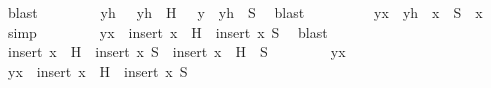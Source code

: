\begin{isabellebody}
\ blast\isanewline
\ \ \ \ \isamarkupfalse%
\ {}\ \isamarkupfalse%
\ yh\ \ {}{\isacharcolon}{\kern0pt}\ {\isachardoublequoteopen}yh\ {\isasymin}\ H{\isachardoublequoteclose}\ \ {}{\isacharcolon}{\kern0pt}\ {\isachardoublequoteopen}y\ {\isacharequal}{\kern0pt}\ yh\ {\isasyminter}\ S{\isachardoublequoteclose}\ \isamarkupfalse%
\ blast\isanewline
\ \ \ \ \isamarkupfalse%
\ {}\ {}\ \isamarkupfalse%
\ {\isachardoublequoteopen}y{\isacharunderscore}{\kern0pt}x\ {\isacharequal}{\kern0pt}\ {\isacharparenleft}{\kern0pt}yh\ {\isasymunion}\ {\isacharbraceleft}{\kern0pt}x{\isacharbraceright}{\kern0pt}{\isacharparenright}{\kern0pt}\ {\isasyminter}\ {\isacharparenleft}{\kern0pt}S\ {\isasymunion}\ {\isacharbraceleft}{\kern0pt}x{\isacharbraceright}{\kern0pt}{\isacharparenright}{\kern0pt}{\isachardoublequoteclose}\ \isamarkupfalse%
\ simp\isanewline
\ \ \ \ \isamarkupfalse%
\ {}\ \isamarkupfalse%
\ {\isachardoublequoteopen}y{\isacharunderscore}{\kern0pt}x\ {\isasymin}\ {\isacharparenleft}{\kern0pt}insert\ x\ {\isacharbackquote}{\kern0pt}\ H{\isacharparenright}{\kern0pt}\ {\isasyminter}{\isacharasterisk}{\kern0pt}\ {\isacharparenleft}{\kern0pt}insert\ x\ S{\isacharparenright}{\kern0pt}{\isachardoublequoteclose}\ \isamarkupfalse%
\ blast\isanewline
\ \ \isamarkupfalse%
\isanewline
{}\isamarkupfalse%
\isanewline
\ \ \isamarkupfalse%
\ {\isachardoublequoteopen}insert\ x\ {\isacharbackquote}{\kern0pt}\ H\ {\isasyminter}{\isacharasterisk}{\kern0pt}\ {\isacharparenleft}{\kern0pt}insert\ x\ S{\isacharparenright}{\kern0pt}\ {\isasymsubseteq}\ insert\ x\ {\isacharbackquote}{\kern0pt}\ {\isacharparenleft}{\kern0pt}H\ {\isasyminter}{\isacharasterisk}{\kern0pt}\ S{\isacharparenright}{\kern0pt}{\isachardoublequoteclose}\isanewline
\ \ \isamarkupfalse%
\isanewline
\ \ \ \ \isamarkupfalse%
\ y{\isacharunderscore}{\kern0pt}x\isanewline
\ \ \ \ \isamarkupfalse%
\ {\isachardoublequoteopen}y{\isacharunderscore}{\kern0pt}x\ {\isasymin}\ insert\ x\ {\isacharbackquote}{\kern0pt}\ H\ {\isasyminter}{\isacharasterisk}{\kern0pt}\ {\isacharparenleft}{\kern0pt}insert\ x\ S{\isacharparenright}{\kern0pt}{\isachardoublequoteclose}\isanewline
\ \ \ \ \isamarkupfalse%
\ \isamarkupfalse%

\end{isabellebody}
